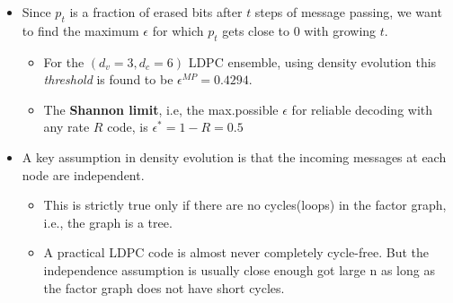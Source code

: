 \documentclass[12pt]{article}
\begin{document}
\begin{itemize}
\begin{figure}[H]
    \end{figure}
    \item Since $p_t$ is a fraction of erased bits after $t$ steps of message passing, we want to find the maximum $\epsilon$ for which $p_t$ gets close to 0 with growing $t$.
    \begin{itemize}
        \item For the $(d_v = 3, d_c = 6)$ LDPC ensemble, using density evolution this \textit{threshold} is found to be $\epsilon^{MP} = 0.4294$.
        \item The \textbf{Shannon limit}, i.e, the max.possible $\epsilon$ for reliable decoding with any rate $R$ code, is $\epsilon^* = 1 -R =0.5$
    \end{itemize}
    \item A key assumption in density evolution is that the incoming messages at each node are independent.
    \begin{itemize}
        \item This is strictly true only if there are no cycles(loops) in the factor graph, i.e., the graph is a tree.
        \item A practical LDPC code is almost never completely cycle-free. But the independence assumption is usually close enough got large n as long as the factor graph does not have short cycles.
    \end{itemize}
\end{itemize}
\end{document}
